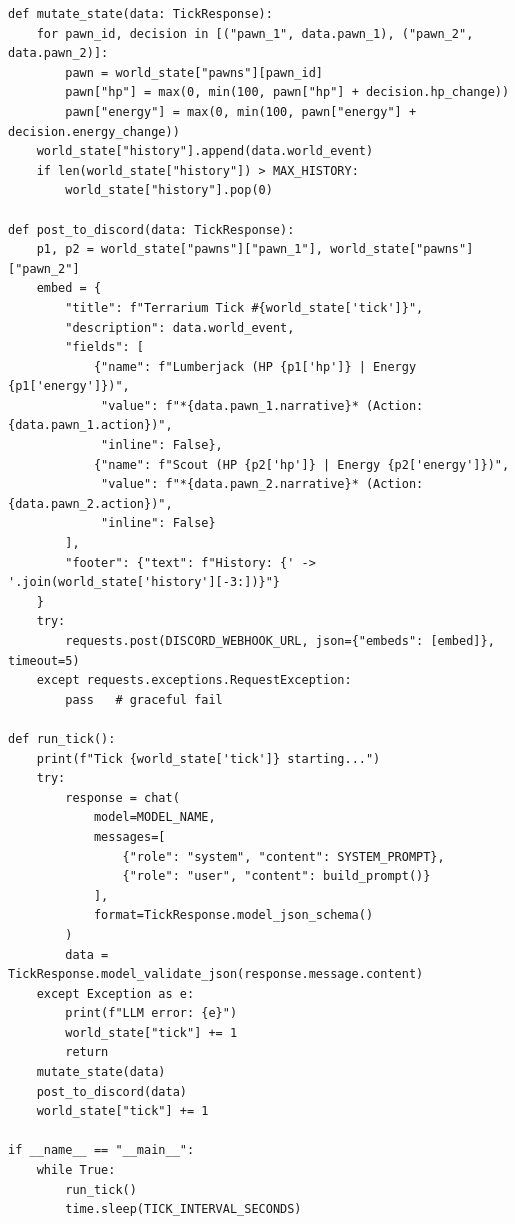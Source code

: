 \documentclass[10pt,a4paper]{article}
\begin{document}
\begin{lstlisting}[style=python, caption={Legacy Monolithic Loop (superseded --- LLM emitted \texttt{hp\_change}, \texttt{energy\_change} deltas directly)}, label={lst:legacy}]
def mutate_state(data: TickResponse):
    for pawn_id, decision in [("pawn_1", data.pawn_1), ("pawn_2", data.pawn_2)]:
        pawn = world_state["pawns"][pawn_id]
        pawn["hp"] = max(0, min(100, pawn["hp"] + decision.hp_change))
        pawn["energy"] = max(0, min(100, pawn["energy"] + decision.energy_change))
    world_state["history"].append(data.world_event)
    if len(world_state["history"]) > MAX_HISTORY:
        world_state["history"].pop(0)

def post_to_discord(data: TickResponse):
    p1, p2 = world_state["pawns"]["pawn_1"], world_state["pawns"]["pawn_2"]
    embed = {
        "title": f"Terrarium Tick #{world_state['tick']}",
        "description": data.world_event,
        "fields": [
            {"name": f"Lumberjack (HP {p1['hp']} | Energy {p1['energy']})",
             "value": f"*{data.pawn_1.narrative}* (Action: {data.pawn_1.action})",
             "inline": False},
            {"name": f"Scout (HP {p2['hp']} | Energy {p2['energy']})",
             "value": f"*{data.pawn_2.narrative}* (Action: {data.pawn_2.action})",
             "inline": False}
        ],
        "footer": {"text": f"History: {' -> '.join(world_state['history'][-3:])}"}
    }
    try:
        requests.post(DISCORD_WEBHOOK_URL, json={"embeds": [embed]}, timeout=5)
    except requests.exceptions.RequestException:
        pass   # graceful fail

def run_tick():
    print(f"Tick {world_state['tick']} starting...")
    try:
        response = chat(
            model=MODEL_NAME,
            messages=[
                {"role": "system", "content": SYSTEM_PROMPT},
                {"role": "user", "content": build_prompt()}
            ],
            format=TickResponse.model_json_schema()
        )
        data = TickResponse.model_validate_json(response.message.content)
    except Exception as e:
        print(f"LLM error: {e}")
        world_state["tick"] += 1
        return
    mutate_state(data)
    post_to_discord(data)
    world_state["tick"] += 1

if __name__ == "__main__":
    while True:
        run_tick()
        time.sleep(TICK_INTERVAL_SECONDS)
\end{lstlisting}
\end{document}
